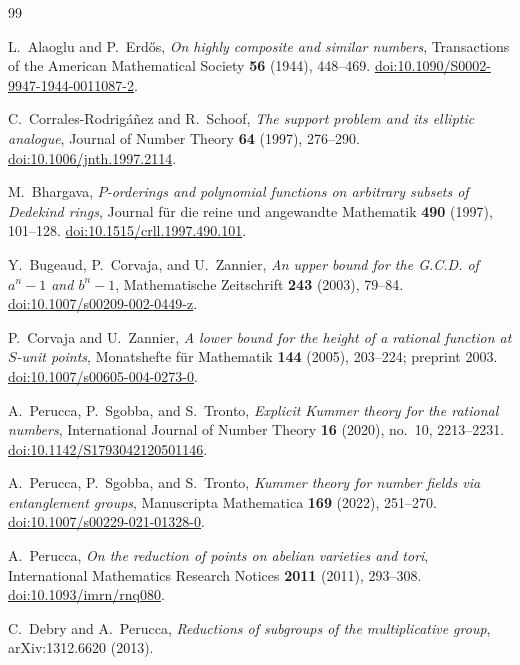 \documentclass[11pt]{article}
\theoremstyle{definition}
\theoremstyle{remark}
\begin{document}
\begin{thebibliography}{99}

L.~Alaoglu and P.~Erd\H{o}s,
\emph{On highly composite and similar numbers},
Transactions of the American Mathematical Society \textbf{56} (1944), 448--469.
\href{https://doi.org/10.1090/S0002-9947-1944-0011087-2}{doi:10.1090/S0002-9947-1944-0011087-2}.

C.~Corrales-Rodrig\'a\~nez and R.~Schoof,
\emph{The support problem and its elliptic analogue},
Journal of Number Theory \textbf{64} (1997), 276--290.
\href{https://doi.org/10.1006/jnth.1997.2114}{doi:10.1006/jnth.1997.2114}.

M.~Bhargava,
\emph{$P$-orderings and polynomial functions on arbitrary subsets of Dedekind rings},
Journal f\"ur die reine und angewandte Mathematik \textbf{490} (1997), 101--128.
\href{https://doi.org/10.1515/crll.1997.490.101}{doi:10.1515/crll.1997.490.101}.

Y.~Bugeaud, P.~Corvaja, and U.~Zannier,
\emph{An upper bound for the G.C.D. of $a^n-1$ and $b^n-1$},
Mathematische Zeitschrift \textbf{243} (2003), 79--84.
\href{https://doi.org/10.1007/s00209-002-0449-z}{doi:10.1007/s00209-002-0449-z}.

P.~Corvaja and U.~Zannier,
\emph{A lower bound for the height of a rational function at $S$-unit points},
Monatshefte f\"ur Mathematik \textbf{144} (2005), 203--224; preprint 2003.
\href{https://doi.org/10.1007/s00605-004-0273-0}{doi:10.1007/s00605-004-0273-0}.

A.~Perucca, P.~Sgobba, and S.~Tronto,
\emph{Explicit Kummer theory for the rational numbers},
International Journal of Number Theory \textbf{16} (2020), no.~10, 2213--2231.
\href{https://doi.org/10.1142/S1793042120501146}{doi:10.1142/S1793042120501146}.

A.~Perucca, P.~Sgobba, and S.~Tronto,
\emph{Kummer theory for number fields via entanglement groups},
Manuscripta Mathematica \textbf{169} (2022), 251--270.
\href{https://doi.org/10.1007/s00229-021-01328-0}{doi:10.1007/s00229-021-01328-0}.

A.~Perucca,
\emph{On the reduction of points on abelian varieties and tori},
International Mathematics Research Notices \textbf{2011} (2011), 293--308.
\href{https://doi.org/10.1093/imrn/rnq080}{doi:10.1093/imrn/rnq080}.

C.~Debry and A.~Perucca,
\emph{Reductions of subgroups of the multiplicative group},
arXiv:1312.6620 (2013).


\end{thebibliography}
\end{document}
